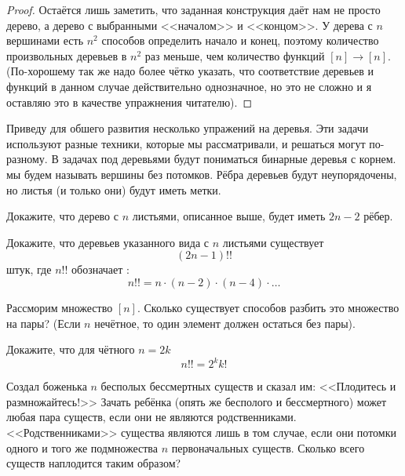 \begin{proof}
Остаётся лишь заметить, что заданная конструкция даёт нам не просто дерево, а дерево с выбранными <<началом>> и <<концом>>. У дерева с $n$ вершинами есть $n^2$ способов определить начало и конец, поэтому количество произвольных деревьев в $n^2$ раз меньше, чем количество функций $[n]\to[n]$. (По-хорошему так же надо более чётко указать, что соответствие деревьев и функций в данном случае действительно однозначное, но это не сложно и я оставляю это в качестве упражнения читателю).
\end{proof}

Приведу для обшего развития несколько упражений на деревья. Эти задачи используют разные техники, которые мы рассматривали, и решаться могут по-разному. В задачах под деревьями будут пониматься бинарные деревья с корнем.  мы будем называть вершины без потомков. Рёбра деревьев будут неупорядочены, но листья (и только они) будут иметь метки.

\begin{exercise}
Докажите, что дерево с $n$ листьями, описанное выше, будет иметь $2n-2$ рёбер.
\end{exercise}

\begin{exercise}
Докажите, что деревьев указанного вида с $n$ листьями существует
$$(2n - 1)!!$$
штук, где $n!!$ обозначает :
$$n!! = n\cdot (n-2) \cdot (n-4) \cdot\ldots$$
\end{exercise}

\begin{exercise}
Рассморим множество $[n]$. Сколько существует способов разбить это множество на пары? (Если $n$ нечётное, то один элемент должен остаться без пары).
\end{exercise}

\begin{exercise}
Докажите, что для чётного $n=2k$
$$n!! = 2^kk!$$
\end{exercise}

\begin{exercise}
Создал боженька $n$ бесполых бессмертных существ и сказал им: <<Плодитесь и размножайтесь!>> Зачать ребёнка (опять же бесполого и бессмертного) может любая пара существ, если они не являются родственниками. <<Родственниками>> существа являются лишь в том случае, если они потомки одного и того же подмножества $n$ первоначальных существ. Сколько всего существ наплодится таким образом? 
\end{exercise}